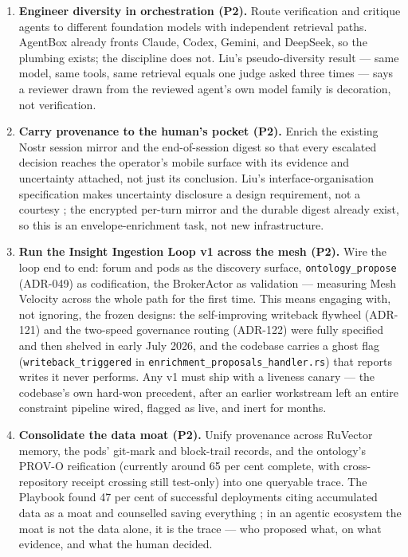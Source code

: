 \begin{enumerate}
  \item \textbf{Engineer diversity in orchestration (P2).} Route verification and critique agents to different foundation models with independent retrieval paths. AgentBox already fronts Claude, Codex, Gemini, and DeepSeek, so the plumbing exists; the discipline does not. Liu's pseudo-diversity result --- same model, same tools, same retrieval equals one judge asked three times \parencite{Liu2026} --- says a reviewer drawn from the reviewed agent's own model family is decoration, not verification.

  \item \textbf{Carry provenance to the human's pocket (P2).} Enrich the existing Nostr session mirror and the end-of-session digest so that every escalated decision reaches the operator's mobile surface with its evidence and uncertainty attached, not just its conclusion. Liu's interface-organisation specification makes uncertainty disclosure a design requirement, not a courtesy \parencite{Liu2026}; the encrypted per-turn mirror and the durable digest already exist, so this is an envelope-enrichment task, not new infrastructure.

  \item \textbf{Run the Insight Ingestion Loop v1 across the mesh (P2).} Wire the loop end to end: forum and pods as the discovery surface, \texttt{ontology\_propose} (ADR-049) as codification, the BrokerActor as validation --- measuring Mesh Velocity across the whole path for the first time. This means engaging with, not ignoring, the frozen designs: the self-improving writeback flywheel (ADR-121) and the two-speed governance routing (ADR-122) were fully specified and then shelved in early July 2026, and the codebase carries a ghost flag (\texttt{writeback\_triggered} in \texttt{enrichment\_proposals\_handler.rs}) that reports writes it never performs. Any v1 must ship with a liveness canary --- the codebase's own hard-won precedent, after an earlier workstream left an entire constraint pipeline wired, flagged as live, and inert for months.

  \item \textbf{Consolidate the data moat (P2).} Unify provenance across RuVector memory, the pods' git-mark and block-trail records, and the ontology's PROV-O reification (currently around 65 per cent complete, with cross-repository receipt crossing still test-only) into one queryable trace. The Playbook found 47 per cent of successful deployments citing accumulated data as a moat and counselled saving everything \parencite{Pereira2026Playbook}; in an agentic ecosystem the moat is not the data alone, it is the trace --- who proposed what, on what evidence, and what the human decided.


\end{enumerate}
